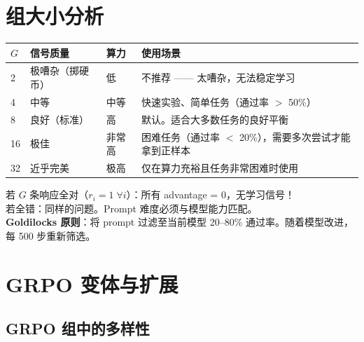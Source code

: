 \section{组大小分析}
\label{group-size-analysis}

\noindent\begin{tabularx}{\linewidth}{@{}l Z{0.45} Z{0.3} Z{2.25}@{}}
\toprule
$G$ & \textbf{信号质量} & \textbf{算力} & \textbf{使用场景} \\
 & 极嘈杂（掷硬币） & 低 & 不推荐 —— 太嘈杂，无法稳定学习 \\
4 & 中等 & 中等 & 快速实验、简单任务（通过率 $>$ 50\%） \\
8 & 良好（标准） & 高 & 默认。适合大多数任务的良好平衡 \\
16 & 极佳 & 非常高 & 困难任务（通过率 $<$ 20\%），需要多次尝试才能拿到正样本 \\
32 & 近乎完美 & 极高 & 仅在算力充裕且任务非常困难时使用 \\
\bottomrule
\end{tabularx}

\begin{keybox}[关键：组内必须同时包含成功与失败]
若 $G$ 条响应全对（$r_i = 1 \;\forall i$）：所有 advantage = 0，无学习信号！\\

若全错：同样的问题。Prompt 难度必须与模型能力匹配。\\

\textbf{Goldilocks 原则}：将 prompt 过滤至当前模型 20--80\% 通过率。随着模型改进，每 500 步重新筛选。
\end{keybox}

\section{GRPO 变体与扩展}
\label{grpo-variants-and-extensions}

\subsection{GRPO 组中的多样性}
\label{diversity-in-grpo-groups}

